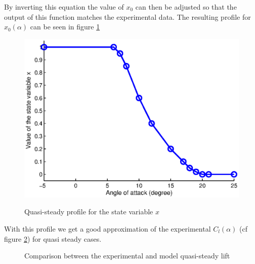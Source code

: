 \par By inverting this equation the value of $x_0$ can then be adjusted so that the output of this function matches the experimental data. 
The resulting profile for $x_0(\alpha)$ can be seen in figure \ref{fig:x_0_vs_alpha}

\begin{figure}[h]
  \begin{center}
    \scalebox{1.0}
    {\includegraphics{./Figures/x_0_vs_alpha.eps}}
  \end{center}
  \caption{Quasi-steady profile for the state variable $x$}
  \label{fig:x_0_vs_alpha}
\end{figure}

\FloatBarrier
With this profile we get a good approximation of the experimental $C_l(\alpha)$ (cf figure \ref{fig:GK_Cl_vs_alpha}) for quasi steady cases.

\begin{figure}[h]
  \begin{center}
  \end{center}
  \caption{Comparison between the experimental and model quasi-steady lift}
  \label{fig:GK_Cl_vs_alpha}
\end{figure}

